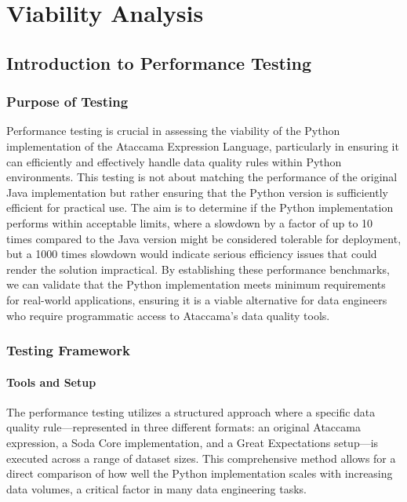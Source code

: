 
\chapter{Viability Analysis}


\section{Introduction to Performance Testing}

\subsection{Purpose of Testing}


Performance testing is crucial in assessing the viability of the Python implementation of the Ataccama Expression Language, particularly in ensuring it can efficiently and effectively handle data quality rules within Python environments. This testing is not about matching the performance of the original Java implementation but rather ensuring that the Python version is sufficiently efficient for practical use. The aim is to determine if the Python implementation performs within acceptable limits, where a slowdown by a factor of up to 10 times compared to the Java version might be considered tolerable for deployment, but a 1000 times slowdown would indicate serious efficiency issues that could render the solution impractical. By establishing these performance benchmarks, we can validate that the Python implementation meets minimum requirements for real-world applications, ensuring it is a viable alternative for data engineers who require programmatic access to Ataccama's data quality tools.

\subsection{Testing Framework}

\subsubsection{Tools and Setup}

The performance testing utilizes a structured approach where a specific data quality rule—represented in three different formats: an original Ataccama expression, a Soda Core implementation, and a Great Expectations setup—is executed across a range of dataset sizes. This comprehensive method allows for a direct comparison of how well the Python implementation scales with increasing data volumes, a critical factor in many data engineering tasks.

